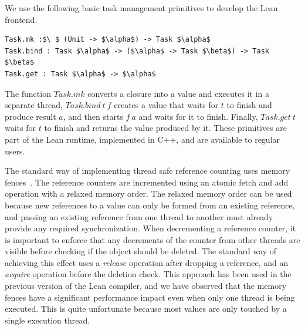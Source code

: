 We use the following basic task management primitives to
develop the Lean frontend.
\begin{lstlisting}
Task.mk :$\ $ (Unit -> $\alpha$) -> Task $\alpha$
Task.bind : Task $\alpha$ -> ($\alpha$ -> Task $\beta$) -> Task $\beta$
Task.get : Task $\alpha$ -> $\alpha$
\end{lstlisting}
The function $\textit{Task.mk}$ converts a closure into a  value
and executes it in a separate thread,
$\textit{Task.bind}\ t\ f$ creates a  value that waits for $t$ to finish and
produce result $a$, and then starts $f\ a$ and waits for it to finish.
Finally, $\textit{Task.get}\ t$ waits for $t$ to finish and returns the
value produced by it. These primitives are part of the Lean runtime,
implemented in C++, and are available to regular users.

The standard way of implementing thread safe reference counting uses
memory fences~\cite{Boost}.  The reference counters are incremented
using an atomic fetch and add operation with a relaxed memory
order. The relaxed memory order can be used because new references to
a value can only be formed from an existing reference, and passing
an existing reference from one thread to another must already provide
any required synchronization. When decrementing a reference counter, it
is important to enforce that any decrements of the counter from other threads
are visible before checking if the object should be deleted. The
standard way of achieving this effect uses a \emph{release} operation
after dropping a reference, and an \emph{acquire} operation before
the deletion check. This approach has been used in the previous
version of the Lean compiler, and we have observed that the memory
fences have a significant performance impact even when only one thread
is being executed. This is quite unfortunate because most values
are only touched by a single execution thread.

